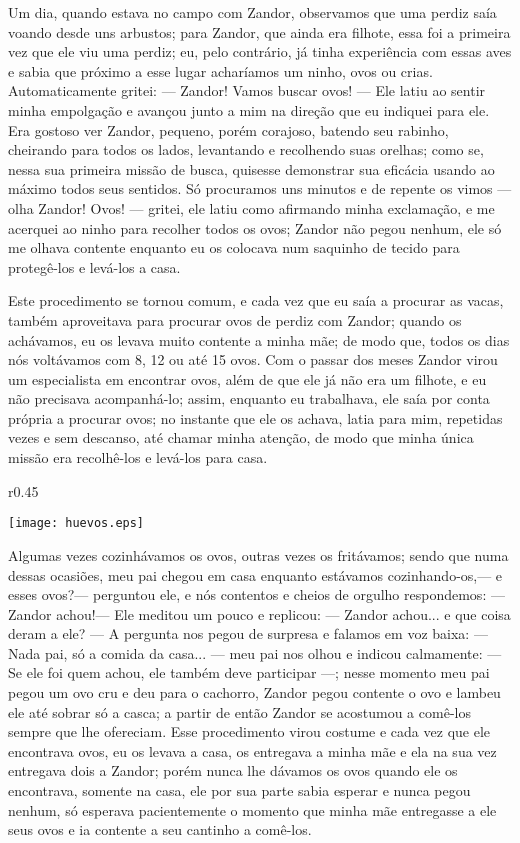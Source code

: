 Um dia, quando estava no campo com Zandor, observamos que uma perdiz saía voando desde uns arbustos; para Zandor, que ainda era filhote, essa foi a primeira vez que ele viu uma perdiz; eu, pelo contrário, já tinha experiência com essas aves e sabia que próximo a esse lugar acharíamos um ninho, ovos ou crias. 
Automaticamente gritei: 
--- Zandor! Vamos buscar ovos! --- 
Ele latiu ao sentir minha empolgação e avançou junto a mim na direção que eu indiquei para ele. 
Era gostoso ver Zandor, pequeno, porém corajoso, batendo seu rabinho, cheirando para todos os lados, levantando e recolhendo suas orelhas; como se, nessa sua primeira missão de busca, quisesse demonstrar sua eficácia usando ao máximo todos seus sentidos. 
Só procuramos uns minutos e de repente os vimos --- olha Zandor! Ovos! --- gritei, ele latiu como afirmando minha exclamação, e me acerquei ao ninho para recolher todos os ovos; Zandor não pegou nenhum, ele só me olhava contente enquanto eu os colocava num saquinho de tecido para protegê-los e levá-los a casa. 


Este procedimento se tornou comum, e cada vez que eu saía a procurar as vacas, também aproveitava para procurar ovos de perdiz com Zandor; quando os achávamos, eu os levava muito contente a minha mãe; de modo que, todos os dias nós voltávamos com 8, 12 ou até 15 ovos. 
Com o passar dos meses Zandor virou um especialista em encontrar ovos, além de que ele já não era um filhote, e eu não precisava acompanhá-lo; assim, enquanto eu trabalhava, ele saía por conta própria a procurar ovos; no instante que ele os achava, latia para mim, repetidas vezes e sem descanso, até chamar minha atenção, de modo que minha única missão era recolhê-los e levá-los para casa.
\begin{wrapfigure}{r}{0.45\textwidth}
  \begin{center}
  \vspace{-20pt}
    \texttt{[image: huevos.eps]}
  \end{center}
  \vspace{-20pt}
\end{wrapfigure}
Algumas vezes cozinhávamos os ovos, outras vezes os fritávamos; sendo que numa dessas ocasiões, meu pai chegou em casa enquanto estávamos cozinhando-os,--- e esses ovos?--- perguntou ele, 
e nós contentos e cheios de orgulho respondemos: 
--- Zandor achou!---
Ele meditou um pouco e replicou: 
--- Zandor achou... e que coisa deram a ele? --- 
A pergunta nos pegou de surpresa e falamos em voz baixa: 
--- Nada pai, só a comida da casa... --- meu pai nos olhou e indicou calmamente: 
--- Se ele foi quem achou, ele também deve participar ---; 
nesse momento meu pai pegou um ovo cru e deu para o cachorro, Zandor pegou contente o ovo e lambeu ele até sobrar só a casca; a partir de então Zandor se acostumou a comê-los sempre que lhe ofereciam. Esse procedimento virou costume e cada vez que ele encontrava ovos, eu os levava a casa, os entregava a minha mãe e ela na sua vez entregava dois a Zandor; porém nunca lhe dávamos os ovos quando ele os encontrava, somente na casa, ele por sua parte sabia esperar e nunca pegou nenhum, só esperava pacientemente o momento que minha mãe entregasse a ele seus ovos e ia contente a seu cantinho a comê-los.


